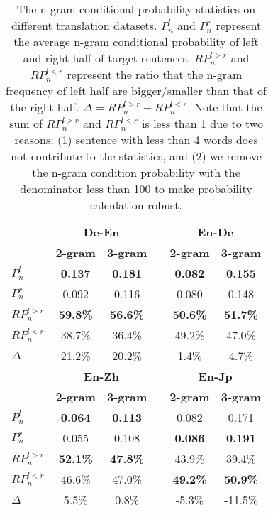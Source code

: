 \documentclass[11pt,a4paper]{article}
\begin{document}


\begin{table}[!tpb]
\centering
\small
\begin{tabular}{l c c c c c}
\toprule
& \multicolumn{2}{c}{\textbf{De-En}} & & \multicolumn{2}{c}{\textbf{En-De}}   \\
\cmidrule{2-3}  \cmidrule{5-6}

& \textbf{2-gram} &  \textbf{3-gram} & &\textbf{2-gram} & \textbf{3-gram} \\
\midrule
$P^{l}_{n}$ & \textbf{0.137} & \textbf{0.181} & & \textbf{0.082} & \textbf{0.155} \\
$P^{r}_{n}$ & 0.092 & 0.116 & & 0.080 & 0.148 \\
\midrule
$RP^{l>r}_{n}$ & \textbf{59.8\%} & \textbf{56.6\%} & & \textbf{50.6\%} & \textbf{51.7\%} \\
$RP^{l<r}_{n}$ & 38.7\% & 36.4\% & & 49.2\% & 47.0\% \\
$\Delta$ &  21.2\%  &  20.2\% &  & 1.4\% &  4.7\% \\
\bottomrule
\bottomrule
& \multicolumn{2}{c}{\textbf{En-Zh}} & & \multicolumn{2}{c}{\textbf{En-Jp}} \\
\cmidrule{2-3}  \cmidrule{5-6}

& \textbf{2-gram} &  \textbf{3-gram} & &\textbf{2-gram} & \textbf{3-gram} \\
\midrule
$P^{l}_{n}$ & \textbf{0.064} & \textbf{0.113} & & 0.082 & 0.171 \\
$P^{r}_{n}$ & 0.055 & 0.108 & & \textbf{0.086} & \textbf{0.191} \\
\midrule
$RP^{l>r}_{n}$ & \textbf{52.1\%} & \textbf{47.8\%} & & 43.9\% & 39.4\% \\
$RP^{l<r}_{n}$ & 46.6\% & 47.0\% &  & \textbf{49.2\%} & \textbf{50.9\%} \\
$\Delta$ &  5.5\%  & 0.8\% &  & -5.3\% &  -11.5\% \\
\bottomrule
\end{tabular}
\caption{The n-gram conditional probability statistics on different translation datasets. $P^{l}_{n}$ and $P^{r}_{n}$ represent the average n-gram conditional probability of left and right half of target sentences. $RP^{l>r}_{n}$ and $RP^{l<r}_{n}$ represent the ratio that the n-gram frequency of left half are bigger/smaller than that of the right half. $\Delta=RP^{l>r}_{n}-RP^{l<r}_{n}$. Note that the sum of $RP^{l>r}_{n}$ and $RP^{l<r}_{n}$ is less than 1 due to two reasons: (1) sentence with less than 4 words does not contribute to the statistics, and (2) we remove the n-gram condition probability with the denominator less than 100 to make probability calculation robust.}
\label{table_ngram_prob}
\end{table}
\end{document}
